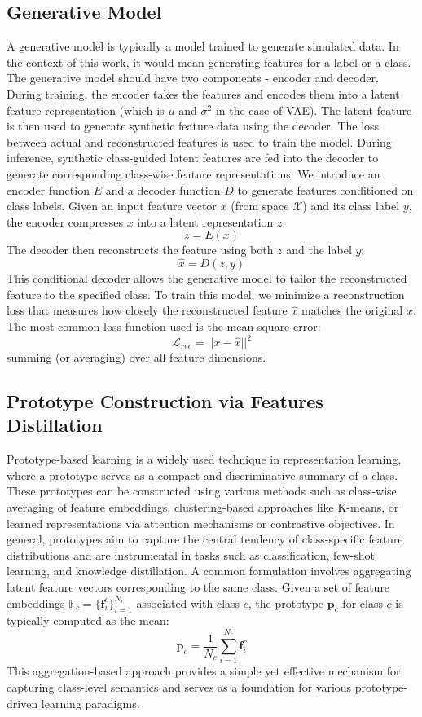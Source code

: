 \documentclass[lettersize,journal]{IEEEtran}
\begin{document}
\subsection{Generative Model}
A generative model is typically a model trained to generate simulated data. In the context of this work, it would mean generating features for a label or a class. 
The generative model should have two components - encoder and decoder. During training, the encoder takes the features and encodes them into a latent feature representation (which is $\mu$ and $\sigma^2$ in the case of VAE). The latent feature is then used to generate synthetic feature data using the decoder. The loss between actual and reconstructed features is used to train the model. During inference, synthetic class-guided latent features are fed into the decoder to generate corresponding class-wise feature representations. We introduce an encoder function $E$ and a decoder function $D$ to generate features conditioned on class labels. Given an input feature vector $x$ (from space $\mathcal{X}$) and its class label $y$, the encoder compresses $x$ into a latent representation $z$.
$$z = E(x)$$
The decoder then reconstructs the feature using both $z$ and the label $y$:
$$\hat{x} = D(z,y)$$
This conditional decoder allows the generative model to tailor the reconstructed feature to the specified class. To train this model, we minimize a reconstruction loss that measures how closely the reconstructed feature $\hat{x}$ matches the original $x$. The most common loss function used is the mean square error:
$$\mathcal{L}_{rec} = ||x-\hat{x}||^2$$
summing (or averaging) over all feature dimensions.

\subsection{Prototype Construction via Features Distillation}
Prototype-based learning is a widely used technique in representation learning, where a prototype serves as a compact and discriminative summary of a class. These prototypes can be constructed using various methods such as class-wise averaging of feature embeddings, clustering-based approaches like K-means, or learned representations via attention mechanisms or contrastive objectives. In general, prototypes aim to capture the central tendency of class-specific feature distributions and are instrumental in tasks such as classification, few-shot learning, and knowledge distillation. A common formulation involves aggregating latent feature vectors corresponding to the same class. Given a set of feature embeddings $\mathbb{F}_c = \{\mathbf{f}_i^c\}_{i=1}^{N_c}$ associated with class $c$, the prototype $\mathbf{p}_c$ for class $c$ is typically computed as the mean:
\begin{equation}
    \mathbf{p}_c = \frac{1}{N_c} \sum_{i=1}^{N_c} \mathbf{f}_i^c
\end{equation}
This aggregation-based approach provides a simple yet effective mechanism for capturing class-level semantics and serves as a foundation for various prototype-driven learning paradigms.
\end{document}
